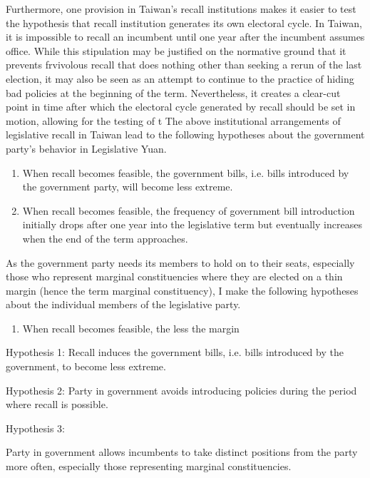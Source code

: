 \documentclass[hyphens, crop=false]{standalone}
\begin{document}
	Furthermore,
	one provision in Taiwan's recall institutions
	makes it easier to test the hypothesis that recall institution generates its own electoral cycle.
	In Taiwan,
	it is impossible to recall an incumbent until one year after the incumbent assumes office.
	While this stipulation may be justified on the normative ground
	that it prevents frvivolous recall that does nothing other than seeking a rerun of the last election,
	it may also be seen as an attempt to continue to the practice of hiding bad policies at the beginning of the term.
	Nevertheless,
	it creates a clear-cut point in time
	after which the electoral cycle generated by recall should be set in motion,
	allowing for the testing of t
	The above institutional arrangements of legislative recall in Taiwan
	lead to the following
	hypotheses about the government party's behavior in Legislative Yuan.
	\begin{enumerate}
		\item
		When recall becomes feasible, the government bills, i.e. bills introduced by the government party, will become less extreme.
		\item
		When recall becomes feasible, the frequency of government bill introduction initially drops
		after one year into the legislative term
		but eventually increases when the end of the term approaches.
	\end{enumerate}
	
	As the government party needs its members to hold on to their seats,
	especially those who represent marginal constituencies where they are elected on a thin margin (hence the term marginal constituency),
	I make the following hypotheses about the individual members of the legislative party.
	\begin{enumerate}
		\item
		When recall becomes feasible, the less the margin
	\end{enumerate}
	
	
	
	
	Hypothesis 1:
	Recall  induces the government bills, i.e. bills introduced by the government, to become less extreme.
	
	Hypothesis 2:
	Party in government avoids introducing policies during the period where
	recall is possible.
	
	Hypothesis 3:
	
	Party in government allows incumbents to take distinct positions from the party
	more often, especially those representing marginal constituencies.
	
\end{document}
